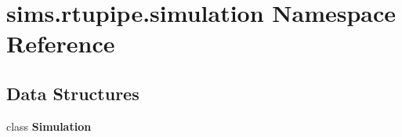 \section{sims.\+rtupipe.\+simulation Namespace Reference}
\label{namespacesims_1_1rtupipe_1_1simulation}
\subsection*{Data Structures}
\begin{DoxyCompactItemize}
\item 
class {\bf Simulation}
\end{DoxyCompactItemize}
